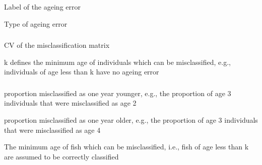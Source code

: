 
 {Label of the ageing error}

 {Type of ageing error}

\subsubsection[Data]{}

\subsubsection[None]{}

\subsubsection[Normal]{}

 {CV of the misclassification matrix}

 {k defines the minimum age of individuals which can be misclassified, e.g., individuals of age less than k have no ageing error}

\subsubsection[Off By One]{}

 {proportion misclassified as one year younger, e.g., the proportion of age 3 individuals that were misclassified as age 2}

 {proportion misclassified as one year older, e.g., the proportion of age 3 individuals that were misclassified as age 4}

 {The minimum age of fish which can be misclassified, i.e., fish of age less than k are assumed to be correctly classified}

